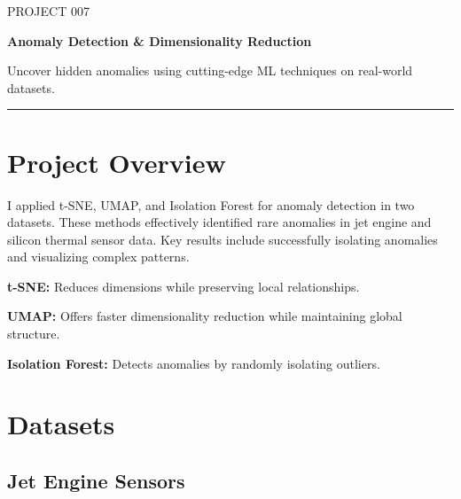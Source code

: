 \documentclass[11pt,a4paper]{article}
\begin{document}
\thispagestyle{empty}

{\colorbox{primary}{}}

\vspace{6pt}

{\fontsize{9}{11}\selectfont\color{codemuted}PROJECT 007}

\vspace{1pt}
{\fontsize{22}{27}\selectfont\bfseries\color{titleblue} Anomaly Detection \& Dimensionality Reduction}

\vspace{2pt}
{\normalsize\color{accent} Uncover hidden anomalies using cutting-edge ML techniques on real-world datasets.}

\vspace{4pt}
{\color{tableheader}\rule{\linewidth}{0.4pt}}

\vspace{3pt}

\section{Project Overview}

I applied t-SNE, UMAP, and Isolation Forest for anomaly detection in two datasets. These methods effectively identified rare anomalies in jet engine and silicon thermal sensor data. Key results include successfully isolating anomalies and visualizing complex patterns.

\textbf{t-SNE:} Reduces dimensions while preserving local relationships.

\textbf{UMAP:} Offers faster dimensionality reduction while maintaining global structure.

\textbf{Isolation Forest:} Detects anomalies by randomly isolating outliers.


\section{Datasets}

\subsection{Jet Engine Sensors}
\end{document}
